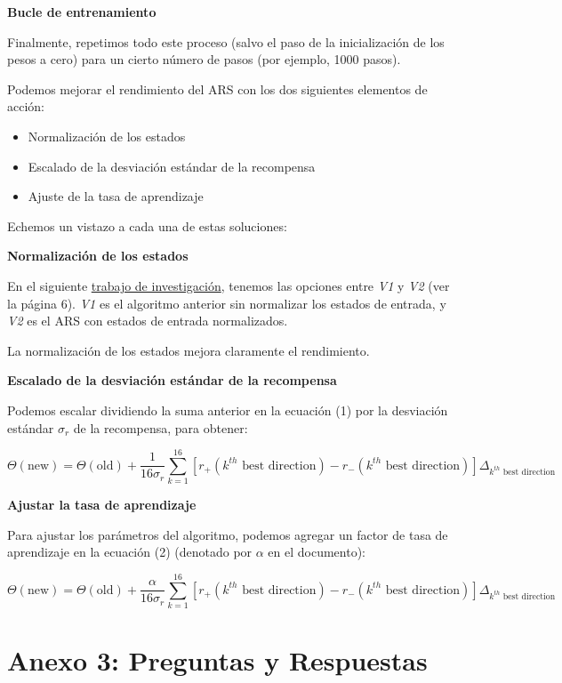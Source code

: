 \documentclass[
]{book}
\providecommand{\tightlist}{%
  \setlength{\itemsep}{0pt}\setlength{\parskip}{0pt}}
\begin{document}
\textbf{Bucle de entrenamiento}

Finalmente, repetimos todo este proceso (salvo el paso de la inicialización de los pesos a cero) para un cierto número de pasos (por ejemplo, 1000 pasos).

Podemos mejorar el rendimiento del ARS con los dos siguientes elementos de acción:

\begin{itemize}
\tightlist
\item
  Normalización de los estados
\item
  Escalado de la desviación estándar de la recompensa
\item
  Ajuste de la tasa de aprendizaje
\end{itemize}

Echemos un vistazo a cada una de estas soluciones:

\textbf{Normalización de los estados}

En el siguiente \href{https://arxiv.org/pdf/1803.07055.pdf}{trabajo de investigación}, tenemos las opciones entre \emph{V1} y \emph{V2} (ver la página 6). \emph{V1} es el algoritmo anterior sin normalizar los estados de entrada, y \emph{V2} es el ARS con estados de entrada normalizados.

La normalización de los estados mejora claramente el rendimiento.

\textbf{Escalado de la desviación estándar de la recompensa}

Podemos escalar dividiendo la suma anterior en la ecuación (1) por la desviación estándar \(\sigma_r\) de la recompensa, para obtener:

\[
\Theta(\textrm{new}) = \Theta(\textrm{old}) + \frac{1}{16 \sigma_r} \sum_{k=1}^{16} [r_{+}(\textrm{$k^{th}$ best direction}) - r_{-}(\textrm{$k^{th}$ best direction})] \Delta_{\textrm{$k^{th}$ best direction}}
\]

\textbf{Ajustar la tasa de aprendizaje}

Para ajustar los parámetros del algoritmo, podemos agregar un factor de tasa de aprendizaje en la ecuación (2) (denotado por \(\alpha\) en el documento):

\[
\Theta(\textrm{new}) = \Theta(\textrm{old}) + \frac{\alpha}{16 \sigma_r} \sum_{k=1}^{16} [r_{+}(\textrm{$k^{th}$ best direction}) - r_{-}(\textrm{$k^{th}$ best direction})] \Delta_{\textrm{$k^{th}$ best direction}}
\]

\hypertarget{anexo-3-preguntas-y-respuestas}{%
\section{Anexo 3: Preguntas y Respuestas}\label{anexo-3-preguntas-y-respuestas}}
\end{document}
